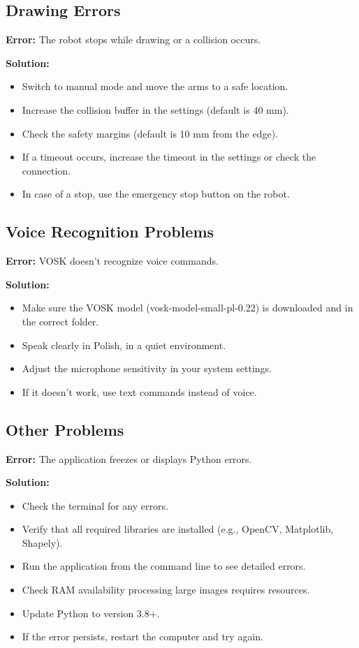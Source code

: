 \documentclass[a4paper,12pt]{article}
\begin{document}
\subsection{Drawing Errors}
\textbf{Error:} The robot stops while drawing or a collision occurs.

\textbf{Solution:}
\begin{itemize}
\item Switch to manual mode and move the arms to a safe location.
\item Increase the collision buffer in the settings (default is 40 mm).
\item Check the safety margins (default is 10 mm from the edge).
\item If a timeout occurs, increase the timeout in the settings or check the connection.
\item In case of a stop, use the emergency stop button on the robot.
\end{itemize}

\subsection{Voice Recognition Problems}
\textbf{Error:} VOSK doesn't recognize voice commands.

\textbf{Solution:}
\begin{itemize}
\item Make sure the VOSK model (vosk-model-small-pl-0.22) is downloaded and in the correct folder.
\item Speak clearly in Polish, in a quiet environment.
\item Adjust the microphone sensitivity in your system settings.
\item If it doesn't work, use text commands instead of voice.
\end{itemize}
\subsection{Other Problems}
\textbf{Error:} The application freezes or displays Python errors.

\textbf{Solution:}
\begin{itemize}
\item Check the terminal for any errors.
\item Verify that all required libraries are installed (e.g., OpenCV, Matplotlib, Shapely).
\item Run the application from the command line to see detailed errors.
\item Check RAM availability processing large images requires resources.
\item Update Python to version 3.8+.
\item If the error persists, restart the computer and try again.
\end{itemize}
\end{document}

